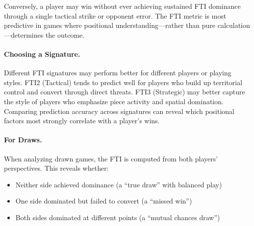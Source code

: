 \documentclass[11pt]{book}
\begin{document}
Conversely, a player may win without ever achieving sustained FTI dominance through a single tactical strike or opponent error. The FTI metric is most predictive in games where positional understanding---rather than pure calculation---determines the outcome.

\paragraph{Choosing a Signature.} Different FTI signatures may perform better for different players or playing styles. FTI2 (Tactical) tends to predict well for players who build up territorial control and convert through direct threats. FTI3 (Strategic) may better capture the style of players who emphasize piece activity and spatial domination. Comparing prediction accuracy across signatures can reveal which positional factors most strongly correlate with a player's wins.

\paragraph{For Draws.} When analyzing drawn games, the FTI is computed from both players' perspectives. This reveals whether:
\begin{itemize}
\item Neither side achieved dominance (a ``true draw'' with balanced play)
\item One side dominated but failed to convert (a ``missed win'')
\item Both sides dominated at different points (a ``mutual chances draw'')
\end{itemize}
\end{document}
